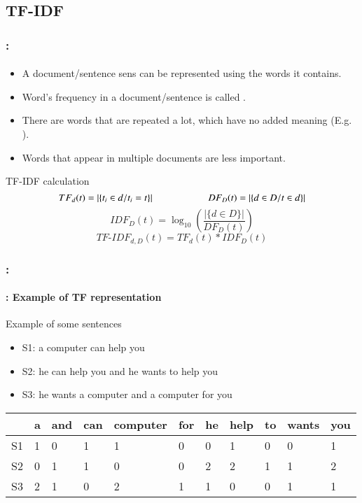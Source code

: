 \documentclass[xcolor=table]{beamer}
\begin{document}
\subsection{TF-IDF}

\begin{frame}
	\frametitle{\insertshortsubtitle: \insertsection}
	\framesubtitle{\insertsubsection}

	\begin{itemize}
		\item A document/sentence sens can be represented using the words it contains. 
		\item Word's frequency in a document/sentence is called .
		\item There are words that are repeated a lot, which have no added meaning (E.g. ).
		\item Words that appear in multiple documents are less important.
	\end{itemize}
	
	\begin{block}{TF-IDF calculation}
		\[
		TF_d(t) =  |\{t_i \in d / t_i = t\}|
		\hskip2cm 
		DF_D(t) = |\{d \in D / t \in d\}|
		\]
		\[IDF_D(t) = \log_{10} \left( \frac{|\{d \in D\}|}{DF_D(t)} \right)\]
		\[TF\text{-}IDF_{d, D}(t) = TF_d(t) * IDF_D(t)\]
	\end{block}

\end{frame}


\begin{frame}
	\frametitle{\insertshortsubtitle: \insertsection}
	\framesubtitle{\insertsubsection: Example of TF representation}

	\begin{exampleblock}{Example of some sentences}
		\begin{itemize}
			\item S1: a computer can help you
			\item S2: he can help you and he wants to help you
			\item S3: he wants a computer and a computer for you
		\end{itemize}
	\end{exampleblock}
	
	\begin{center}
		\begin{tabular}{lllllllllll}
		\hline\hline
		& a & and & can & computer & for & he & help & to & wants & you \\
		\hline
		S1 & 1 & 0 & 1 & 1 & 0 & 0 & 1 & 0 & 0 & 1\\
		S2 & 0 & 1 & 1 & 0 & 0 & 2 & 2 & 1 & 1 & 2\\
		S3 & 2 & 1 & 0 & 2 & 1 & 1 & 0 & 0 & 1 & 1\\
		\hline\hline
	\end{tabular}
	\end{center}

\end{frame}
\end{document}

